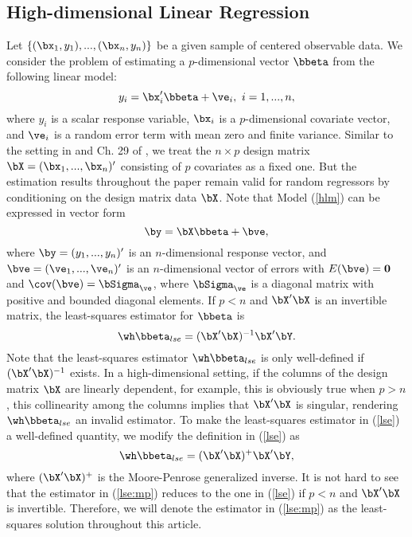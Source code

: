 		\subsection{High-dimensional Linear Regression}\label{model_overview}
	Let $\{(\bx_1,y_1),...,(\bx_n,y_n)\}$ be a given sample of centered observable data. We consider the problem of estimating a $p$-dimensional vector $\bbeta$ from the following linear model:
 \begin{equation}\label{hlm}
     y_i=\bx_i'\bbeta+\ve_i,\,\,i=1,...,n,
 \end{equation}
where $y_i$ is a scalar response variable, $\bx_i$ is a $p$-dimensional covariate vector, and $\ve_i$ is a random error term with mean zero and finite variance.  Similar to the setting in \cite{hansen2022modern} and Ch. 29 of \cite{hansen2022econometrics}, we treat the $n\times p$ design matrix $\bX=(\bx_1,...,\bx_n)'$ consisting of $p$ covariates as a fixed one. But the estimation results throughout the paper remain valid for random regressors by conditioning on the design matrix data $\bX$. Note that Model (\ref{hlm}) can be expressed in vector form
\begin{equation}\label{v:hlm}
    \by=\bX\bbeta+\bve,
\end{equation}
where $\by=(y_1,...,y_n)'$ is an $n$-dimensional response vector,  and $\bve=(\ve_1,...,\ve_n)'$ is an $n$-dimensional vector of errors with $E(\bve)={\bf 0}$ and $\cov(\bve)=\bSigma_\ve$, where $\bSigma_\ve$ is a diagonal matrix with positive and bounded diagonal elements.  
If $p< n$ and $\bX'\bX$ is an invertible matrix, the least-squares estimator for $\bbeta$ is 
\begin{equation}\label{lse}
    \wh\bbeta_{lse}=(\bX'\bX)^{-1}\bX'\bY.
\end{equation}
Note that the least-squares estimator $\wh\bbeta_{lse}$ is only well-defined if $(\bX'\bX)^{-1}$ exists. In a high-dimensional setting, if the columns of the design matrix $\bX$ are linearly dependent, for example, this is obviously true when $p>n$, this collinearity among the columns implies that $\bX'\bX$ is singular, rendering $\wh\bbeta_{lse}$ an invalid estimator. To make the least-squares estimator in (\ref{lse}) a well-defined quantity, we modify the definition in (\ref{lse}) as
\begin{equation}\label{lse:mp}
    \wh\bbeta_{lse}=(\bX'\bX)^{+}\bX'\bY,
\end{equation}
where $(\bX'\bX)^{+}$ is the Moore-Penrose generalized inverse. It is not hard to see that the estimator in (\ref{lse:mp}) reduces to the one in (\ref{lse})
if $p<n$ and $\bX'\bX$ is invertible. Therefore, we will denote the estimator in (\ref{lse:mp}) as the least-squares solution throughout this article.


